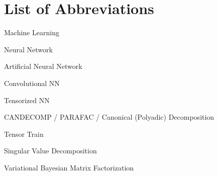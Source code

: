 \section{List of Abbreviations}

\begin{description}[leftmargin=!,labelwidth=2cm]
    \item [ML] Machine Learning
    \item [NN] Neural Network
    \item [ANN] Artificial Neural Network
    \item [CNN] Convolutional NN
    \item [TNN] Tensorized NN
    \item [CP] CANDECOMP / PARAFAC / Canonical (Polyadic) Decomposition
    \item [TT] Tensor Train
    \item [SVD] Singular Value Decomposition
    \item [VBMF] Variational Bayesian Matrix Factorization

\end{description}